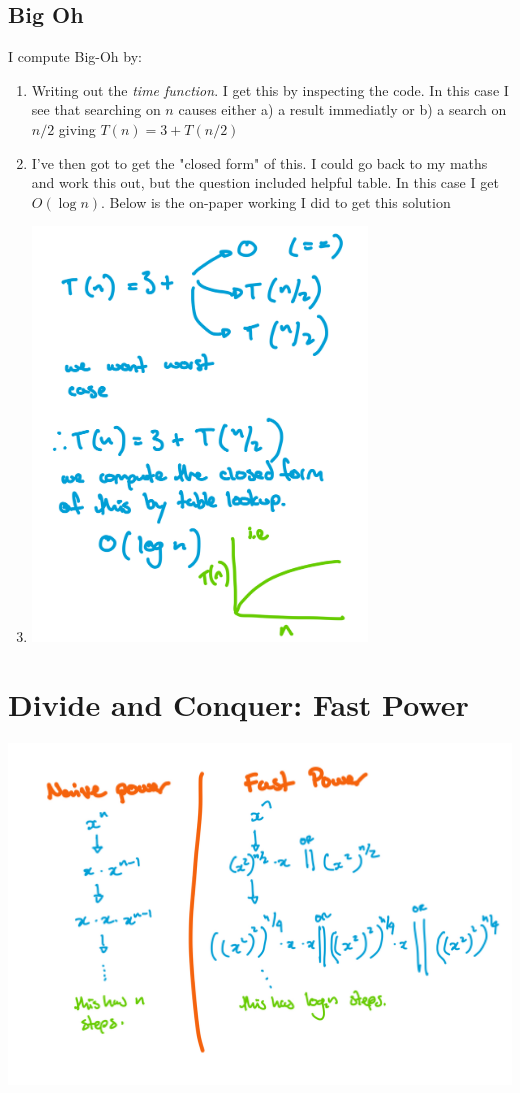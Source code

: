 \documentclass[twoside=false,DIV=14]{scrartcl}
\begin{document}
\subsection{Big Oh}
I compute Big-Oh by:
\begin{enumerate}
\item Writing out the \emph{time function}. I get this by inspecting the code.  In this case I see that searching on $n$ causes either a) a result immediatly or b) a search on $n/2$ giving $T(n) = 3 + T(n/2)$
\item I've then got to get the "closed form"  of this.  I could go back to my maths and work this out, but the question included helpful table.  In this case I get $O(\log {n})$.  Below is  the on-paper working I did to get this solution
\item 
\includegraphics[width=0.7\textwidth]{binary_search_bigoh_trace.jpeg}

\end{enumerate}

\section{Divide and Conquer: Fast Power}
\includegraphics[width=\textwidth]{fast_power.jpeg}
\end{document}
